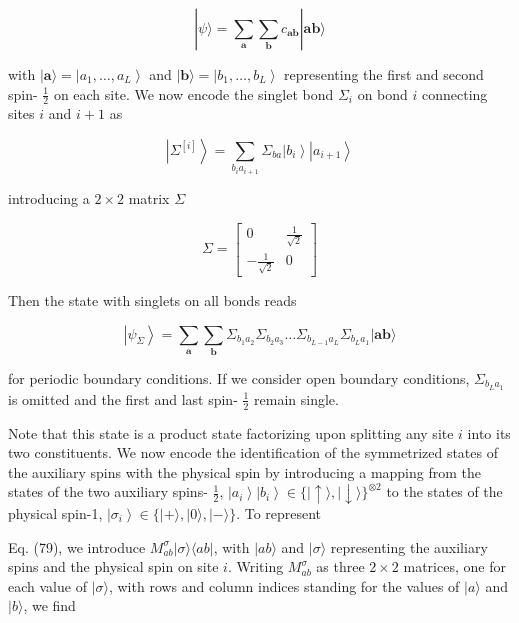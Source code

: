 \documentclass[12pt]{article}
\begin{document}
\begin{equation*}
|\psi\rangle=\sum_{\mathbf{a}} \sum_{\mathbf{b}} c_{\mathbf{a b}}|\mathbf{a b}\rangle \tag{81}
\end{equation*}


with $|\mathbf{a}\rangle=\left|a_{1}, \ldots, a_{L}\right\rangle$ and $|\mathbf{b}\rangle=\left|b_{1}, \ldots, b_{L}\right\rangle$ representing the first and second spin- $\frac{1}{2}$ on each site. We now encode the singlet bond $\Sigma_{i}$ on bond $i$ connecting sites $i$ and $i+1$ as


\begin{equation*}
\left|\Sigma^{[i]}\right\rangle=\sum_{b_{i} a_{i+1}} \Sigma_{b a}\left|b_{i}\right\rangle\left|a_{i+1}\right\rangle \tag{82}
\end{equation*}


introducing a $2 \times 2$ matrix $\Sigma$

\[
\Sigma=\left[\begin{array}{cc}
0 & \frac{1}{\sqrt{2}}  \tag{83}\\
-\frac{1}{\sqrt{2}} & 0
\end{array}\right]
\]

Then the state with singlets on all bonds reads


\begin{equation*}
\left|\psi_{\Sigma}\right\rangle=\sum_{\mathbf{a}} \sum_{\mathbf{b}} \Sigma_{b_{1} a_{2}} \Sigma_{b_{2} a_{3}} \ldots \Sigma_{b_{L-1} a_{L}} \Sigma_{b_{L} a_{1}}|\mathbf{a b}\rangle \tag{84}
\end{equation*}


for periodic boundary conditions. If we consider open boundary conditions, $\Sigma_{b_{L} a_{1}}$ is omitted and the first and last spin- $\frac{1}{2}$ remain single.

Note that this state is a product state factorizing upon splitting any site $i$ into its two constituents. We now encode the identification of the symmetrized states of the auxiliary spins with the physical spin by introducing a mapping from the states of the two auxiliary spins- $\frac{1}{2}$, $\left|a_{i}\right\rangle\left|b_{i}\right\rangle \in\{|\uparrow\rangle,|\downarrow\rangle\}^{\otimes 2}$ to the states of the physical spin-1, $\left|\sigma_{i}\right\rangle \in\{|+\rangle,|0\rangle,|-\rangle\}$. To represent

Eq. (79), we introduce $M_{a b}^{\sigma}|\sigma\rangle\langle a b|$, with $|a b\rangle$ and $|\sigma\rangle$ representing the auxiliary spins and the physical spin on site $i$. Writing $M_{a b}^{\sigma}$ as three $2 \times 2$ matrices, one for each value of $|\sigma\rangle$, with rows and column indices standing for the values of $|a\rangle$ and $|b\rangle$, we find
\end{document}
